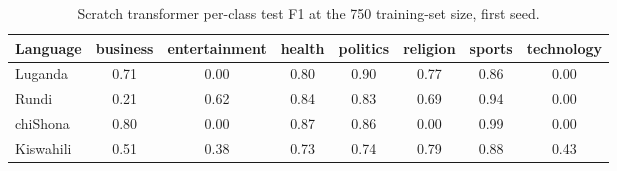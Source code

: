 \begin{table}[t]
\centering
\caption{Scratch transformer per-class test F1 at the 750 training-set size, first seed.}
\label{tab:scratch_per_class_f1_750}
\small
\begin{tabular}{lccccccc}
\toprule
Language & business & entertainment & health & politics & religion & sports & technology \\
\midrule
Luganda & 0.71 & 0.00 & 0.80 & 0.90 & 0.77 & 0.86 & 0.00 \\
Rundi & 0.21 & 0.62 & 0.84 & 0.83 & 0.69 & 0.94 & 0.00 \\
chiShona & 0.80 & 0.00 & 0.87 & 0.86 & 0.00 & 0.99 & 0.00 \\
Kiswahili & 0.51 & 0.38 & 0.73 & 0.74 & 0.79 & 0.88 & 0.43 \\
\bottomrule
\end{tabular}
\end{table}